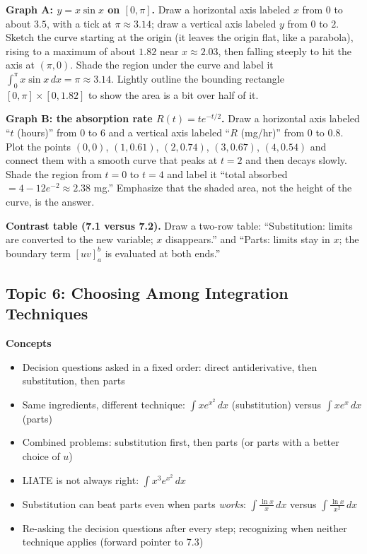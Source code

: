 \documentclass[11pt]{article}
\begin{document}
\begin{notebox}
\textbf{Graph A: $y=x\sin x$ on $[0,\pi]$.} Draw a horizontal axis labeled $x$ from $0$ to about $3.5$, with a tick at $\pi\approx3.14$; draw a vertical axis labeled $y$ from $0$ to $2$. Sketch the curve starting at the origin (it leaves the origin flat, like a parabola), rising to a maximum of about $1.82$ near $x\approx2.03$, then falling steeply to hit the axis at $(\pi,0)$. Shade the region under the curve and label it $\int_0^\pi x\sin x\,dx=\pi\approx3.14$. Lightly outline the bounding rectangle $[0,\pi]\times[0,1.82]$ to show the area is a bit over half of it.

\textbf{Graph B: the absorption rate $R(t)=te^{-t/2}$.} Draw a horizontal axis labeled ``$t$ (hours)'' from $0$ to $6$ and a vertical axis labeled ``$R$ (mg/hr)'' from $0$ to $0.8$. Plot the points $(0,0)$, $(1,0.61)$, $(2,0.74)$, $(3,0.67)$, $(4,0.54)$ and connect them with a smooth curve that peaks at $t=2$ and then decays slowly. Shade the region from $t=0$ to $t=4$ and label it ``total absorbed $=4-12e^{-2}\approx2.38$ mg.'' Emphasize that the shaded area, not the height of the curve, is the answer.

\textbf{Contrast table (7.1 versus 7.2).} Draw a two-row table: ``Substitution: limits are converted to the new variable; $x$ disappears.'' and ``Parts: limits stay in $x$; the boundary term $[uv]_a^b$ is evaluated at both ends.''
\end{notebox}

\subsection{Topic 6: Choosing Among Integration Techniques}

\textbf{Concepts}
\begin{itemize}
\item Decision questions asked in a fixed order: direct antiderivative, then substitution, then parts
\item Same ingredients, different technique: $\int xe^{x^2}\,dx$ (substitution) versus $\int xe^{x}\,dx$ (parts)
\item Combined problems: substitution first, then parts (or parts with a better choice of $u$)
\item LIATE is not always right: $\int x^3e^{x^2}\,dx$
\item Substitution can beat parts even when parts \emph{works}: $\int\frac{\ln x}{x}\,dx$ versus $\int\frac{\ln x}{x^2}\,dx$
\item Re-asking the decision questions after every step; recognizing when neither technique applies (forward pointer to 7.3)
\end{itemize}
\end{document}
